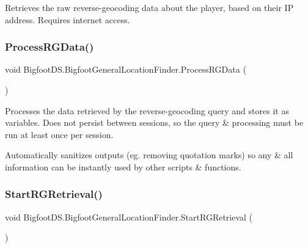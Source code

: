 Retrieves the raw reverse-\/geocoding data about the player, based on their IP address. Requires internet access. 

\mbox{\label{class_bigfoot_d_s_1_1_bigfoot_general_location_finder_a9740c9ca17041986a3c02e4597105b04}} 
\subsubsection{\texorpdfstring{Process\+R\+G\+Data()}{ProcessRGData()}}
{\footnotesize\ttfamily void Bigfoot\+D\+S.\+Bigfoot\+General\+Location\+Finder.\+Process\+R\+G\+Data (\begin{DoxyParamCaption}{ }\end{DoxyParamCaption})}



Processes the data retrieved by the reverse-\/geocoding query and stores it as variables. Does not persist between sessions, so the query \& processing must be run at least once per session. 

Automatically sanitizes outputs (eg. removing quotation marks) so any \& all information can be instantly used by other scripts \& functions. \mbox{\label{class_bigfoot_d_s_1_1_bigfoot_general_location_finder_a5e9cee69dcb8b0537be70f6e7ef8dba2}} 
\subsubsection{\texorpdfstring{Start\+R\+G\+Retrieval()}{StartRGRetrieval()}}
{\footnotesize\ttfamily void Bigfoot\+D\+S.\+Bigfoot\+General\+Location\+Finder.\+Start\+R\+G\+Retrieval (\begin{DoxyParamCaption}{ }\end{DoxyParamCaption})}



